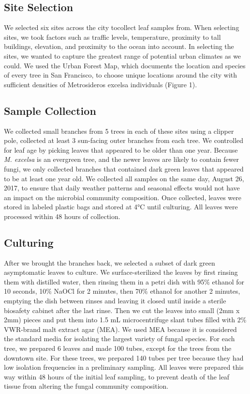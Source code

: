 \documentclass[fleqn,10pt,lineno]{wlpeerj} %
\begin{document}
\hypertarget{site-selection}{%
\subsection{Site Selection}\label{site-selection}}

We selected six sites across the city tocollect leaf samples from. When
selecting sites, we took factors such as traffic levels, temperature,
proximity to tall buildings, elevation, and proximity to the ocean into
account. In selecting the sites, we wanted to capture the greatest range
of potential urban climates as we could. We used the Urban Forest Map,
which documents the location and species of every tree in San Francisco,
to choose unique locations around the city with sufficient densities of
Metrosideros excelsa individuals (Figure 1).

\hypertarget{sample-collection}{%
\subsection{Sample Collection}\label{sample-collection}}

We collected small branches from 5 trees in each of these sites using a
clipper pole, collected at least 3 sun-facing outer branches from each
tree. We controlled for leaf age by picking leaves that appeared to be
older than one year. Because \emph{M. excelsa} is an evergreen tree, and
the newer leaves are likely to contain fewer fungi, we only collected
branches that contained dark green leaves that appeared to be at least
one year old. We collected all samples on the same day, August 26, 2017,
to ensure that daily weather patterns and seasonal effects would not
have an impact on the microbial community composition. Once collected,
leaves were stored in labeled plastic bags and stored at 4°C until
culturing. All leaves were processed within 48 hours of collection.

\hypertarget{culturing}{%
\subsection{Culturing}\label{culturing}}

After we brought the branches back, we selected a subset of dark green
asymptomatic leaves to culture. We surface-sterilized the leaves by
first rinsing them with distilled water, then rinsing them in a petri
dish with 95\% ethanol for 10 seconds, 10\% NaOCl for 2 minutes, then
70\% ethanol for another 2 minutes, emptying the dish between rinses and
leaving it closed until inside a sterile biosafety cabinet after the
last rinse. Then we cut the leaves into small (2mm x 2mm) pieces and put
them into 1.5 mL microcentrifuge slant tubes filled with 2\% VWR-brand
malt extract agar (MEA). We used MEA because it is considered the
standard media for isolating the largest variety of fungal species. For
each tree, we prepared 6 leaves and made 100 tubes, except for the trees
from the downtown site. For these trees, we prepared 140 tubes per tree
because they had low isolation frequencies in a preliminary sampling.
All leaves were prepared this way within 48 hours of the initial leaf
sampling, to prevent death of the leaf tissue from altering the fungal
community composition.
\end{document}
